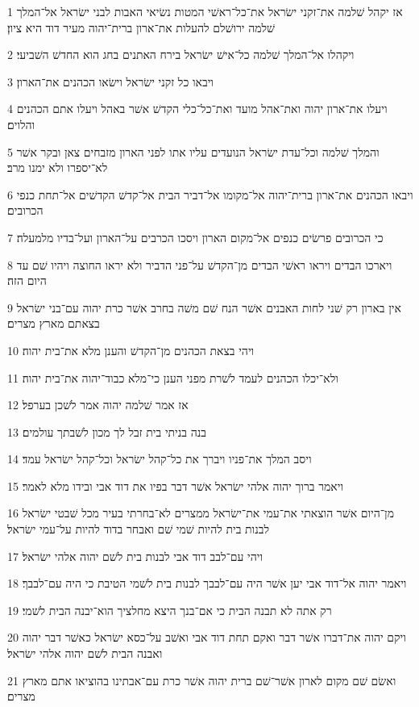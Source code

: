 \par 1 אז יקהל שׁלמה את־זקני ישׂראל את־כל־ראשׁי המטות נשׂיאי האבות לבני ישׂראל אל־המלך שׁלמה ירושׁלם להעלות את־ארון ברית־יהוה מעיר דוד היא ציון׃
\par 2 ויקהלו אל־המלך שׁלמה כל־אישׁ ישׂראל בירח האתנים בחג הוא החדשׁ השׁביעי׃
\par 3 ויבאו כל זקני ישׂראל וישׂאו הכהנים את־הארון׃
\par 4 ויעלו את־ארון יהוה ואת־אהל מועד ואת־כל־כלי הקדשׁ אשׁר באהל ויעלו אתם הכהנים והלוים׃
\par 5 והמלך שׁלמה וכל־עדת ישׂראל הנועדים עליו אתו לפני הארון מזבחים צאן ובקר אשׁר לא־יספרו ולא ימנו מרב׃
\par 6 ויבאו הכהנים את־ארון ברית־יהוה אל־מקומו אל־דביר הבית אל־קדשׁ הקדשׁים אל־תחת כנפי הכרובים׃
\par 7 כי הכרובים פרשׂים כנפים אל־מקום הארון ויסכו הכרבים על־הארון ועל־בדיו מלמעלה׃
\par 8 ויארכו הבדים ויראו ראשׁי הבדים מן־הקדשׁ על־פני הדביר ולא יראו החוצה ויהיו שׁם עד היום הזה׃
\par 9 אין בארון רק שׁני לחות האבנים אשׁר הנח שׁם משׁה בחרב אשׁר כרת יהוה עם־בני ישׂראל בצאתם מארץ מצרים׃
\par 10 ויהי בצאת הכהנים מן־הקדשׁ והענן מלא את־בית יהוה׃
\par 11 ולא־יכלו הכהנים לעמד לשׁרת מפני הענן כי־מלא כבוד־יהוה את־בית יהוה׃
\par 12 אז אמר שׁלמה יהוה אמר לשׁכן בערפל׃
\par 13 בנה בניתי בית זבל לך מכון לשׁבתך עולמים׃
\par 14 ויסב המלך את־פניו ויברך את כל־קהל ישׂראל וכל־קהל ישׂראל עמד׃
\par 15 ויאמר ברוך יהוה אלהי ישׂראל אשׁר דבר בפיו את דוד אבי ובידו מלא לאמר׃
\par 16 מן־היום אשׁר הוצאתי את־עמי את־ישׂראל ממצרים לא־בחרתי בעיר מכל שׁבטי ישׂראל לבנות בית להיות שׁמי שׁם ואבחר בדוד להיות על־עמי ישׂראל׃
\par 17 ויהי עם־לבב דוד אבי לבנות בית לשׁם יהוה אלהי ישׂראל׃
\par 18 ויאמר יהוה אל־דוד אבי יען אשׁר היה עם־לבבך לבנות בית לשׁמי הטיבת כי היה עם־לבבך׃
\par 19 רק אתה לא תבנה הבית כי אם־בנך היצא מחלציך הוא־יבנה הבית לשׁמי׃
\par 20 ויקם יהוה את־דברו אשׁר דבר ואקם תחת דוד אבי ואשׁב על־כסא ישׂראל כאשׁר דבר יהוה ואבנה הבית לשׁם יהוה אלהי ישׂראל׃
\par 21 ואשׂם שׁם מקום לארון אשׁר־שׁם ברית יהוה אשׁר כרת עם־אבתינו בהוציאו אתם מארץ מצרים׃
